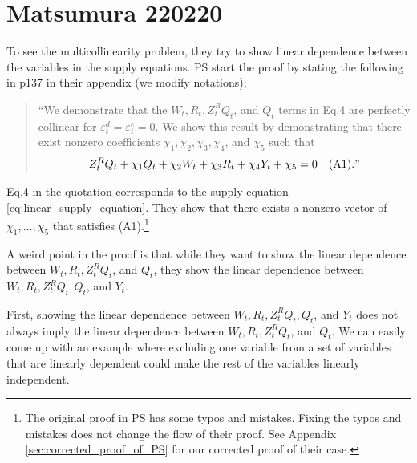 \documentclass[11pt, a4paper]{article}
\begin{document}
\section{Matsumura 220220}
To see the multicollinearity problem, they try to show linear dependence between the variables in the supply equations. 
PS start the proof by stating the following in p137 in their appendix (we modify notations);
\begin{quote}
    ``We demonstrate that the $W_{t}, R_{t}, Z^{R}_{t}Q_{t}$, and $Q_{t}$ terms in Eq.4 are perfectly collinear for $\varepsilon_{t}^{d} = \varepsilon_{t}^{c} = 0$. We show this result by demonstrating that there exist nonzero coefficients $\chi_1,\chi_2,\chi_3,\chi_4$, and $\chi_5$ such that 
   \begin{align*}
    Z^{R}_{t} Q_{t} + \chi_1 Q_{t} + \chi_2 W_{t} + \chi_3 R_{t} + \chi_4 Y_{t} + \chi_5 = 0 \quad (\text{A1})."
    \end{align*}
\end{quote}
Eq.4 in the quotation corresponds to the supply equation \eqref{eq:linear_supply_equation}.
They show that there exists a nonzero vector of $\chi_1, \ldots, \chi_5$ that satisfies (A1).\footnote{The original proof in PS has some typos and mistakes. Fixing the typos and mistakes does not change the flow of their proof. See Appendix \ref{sec:corrected_proof_of_PS} for our corrected proof of their case.}

A weird point in the proof is that while they want to show the linear dependence between $W_{t}, R_{t}, Z^{R}_{t}Q_{t}$, and $Q_{t}$, they show the linear dependence between $W_{t}, R_{t}, Z^{R}_{t}Q_{t}, Q_{t}$, and $Y_t$.

First, showing the linear dependence between $W_{t}, R_{t}, Z^{R}_{t}Q_{t}, Q_{t}$, and $Y_t$ does not always imply the linear dependence between $W_{t}, R_{t}, Z^{R}_{t}Q_{t}$, and $Q_{t}$.
We can easily come up with an example where excluding one variable from a set of variables that are linearly dependent could make the rest of the variables linearly independent.
\end{document}
